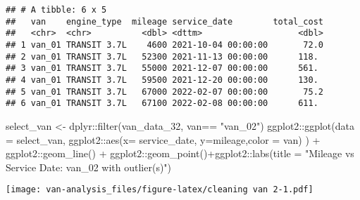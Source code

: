 \documentclass[
]{article}
\newenvironment{Shaded}{\begin{snugshade}}{\end{snugshade}}
\newcommand{\AttributeTok}[1]{\textcolor[rgb]{0.77,0.63,0.00}{#1}}
\newcommand{\FunctionTok}[1]{\textcolor[rgb]{0.00,0.00,0.00}{#1}}
\newcommand{\NormalTok}[1]{#1}
\newcommand{\OtherTok}[1]{\textcolor[rgb]{0.56,0.35,0.01}{#1}}
\newcommand{\SpecialCharTok}[1]{\textcolor[rgb]{0.00,0.00,0.00}{#1}}
\newcommand{\StringTok}[1]{\textcolor[rgb]{0.31,0.60,0.02}{#1}}
\begin{document}
\begin{verbatim}
## # A tibble: 6 x 5
##   van    engine_type  mileage service_date        total_cost
##   <chr>  <chr>          <dbl> <dttm>                   <dbl>
## 1 van_01 TRANSIT 3.7L    4600 2021-10-04 00:00:00       72.0
## 2 van_01 TRANSIT 3.7L   52300 2021-11-13 00:00:00      118. 
## 3 van_01 TRANSIT 3.7L   55000 2021-12-07 00:00:00      561. 
## 4 van_01 TRANSIT 3.7L   59500 2021-12-20 00:00:00      130. 
## 5 van_01 TRANSIT 3.7L   67000 2022-02-07 00:00:00       75.2
## 6 van_01 TRANSIT 3.7L   67100 2022-02-08 00:00:00      611.
\end{verbatim}

\begin{Shaded}
\begin{Highlighting}[]
\NormalTok{ select\_van }\OtherTok{\textless{}{-}}\NormalTok{ dplyr}\SpecialCharTok{::}\FunctionTok{filter}\NormalTok{(van\_data\_32, van}\SpecialCharTok{==} \StringTok{"van\_02"}\NormalTok{)}
\NormalTok{ ggplot2}\SpecialCharTok{::}\FunctionTok{ggplot}\NormalTok{(}\AttributeTok{data =}\NormalTok{ select\_van, ggplot2}\SpecialCharTok{::}\FunctionTok{aes}\NormalTok{(}\AttributeTok{x=}\NormalTok{ service\_date, }\AttributeTok{y=}\NormalTok{mileage,}\AttributeTok{color =}\NormalTok{ van) ) }\SpecialCharTok{+}\NormalTok{ ggplot2}\SpecialCharTok{::}\FunctionTok{geom\_line}\NormalTok{() }\SpecialCharTok{+}\NormalTok{ ggplot2}\SpecialCharTok{::}\FunctionTok{geom\_point}\NormalTok{()}\SpecialCharTok{+}\NormalTok{ggplot2}\SpecialCharTok{::}\FunctionTok{labs}\NormalTok{(}\AttributeTok{title =} \StringTok{"Mileage vs Service Date: van\_02 with outlier(s)"}\NormalTok{)}
\end{Highlighting}
\end{Shaded}

\texttt{[image: van-analysis\_files/figure-latex/cleaning van 2-1.pdf]}
\end{document}

